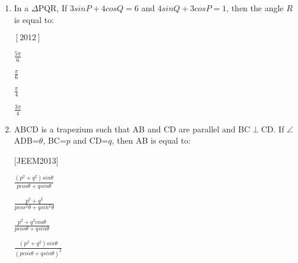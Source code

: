 \documentclass[journal,12pt,twocolumn]{IEEEtran}
\theoremstyle{remark}
\begin{document}
\begin{enumerate}[label={\arabic*}.]
\medskip

\item In a $\Delta$PQR, If $3 sinP + 4 cosQ=6$ and $4sinQ+3cosP=1$, then the angle $R$ is equal to: 

\hfill{$[2012]$}
\medskip
\begin{multicols}{4}

 $\frac{5\pi}{6}$
\columnbreak

 $\frac{\pi}{6}$
\columnbreak

 $\frac{\pi}{4}$
\columnbreak

 $\frac{3\pi}{4}$

\end{multicols}

\item ABCD is a trapezium such that AB and CD are parallel and BC$\perp$CD. If $\angle$ADB=$\theta$, BC=$p$ and CD=$q$, then AB is equal to:

\hfill{$[$JEEM2013$]$}
\medskip
\begin{multicols}{2}

 $\frac{(p^2+q^2)sin\theta}{pcos\theta+qsin\theta}$

 $\frac{p^2+q^2}{pcos^2 \theta+qsin^2 \theta}$
\columnbreak

 $\frac{p^2+q^2cos\theta}{pcos\theta+qsin\theta}$

 $\frac{(p^2+q^2)sin\theta}{(pcos\theta+qsin\theta)^2}$
    
\end{multicols}

\end{enumerate}
\end{document}
